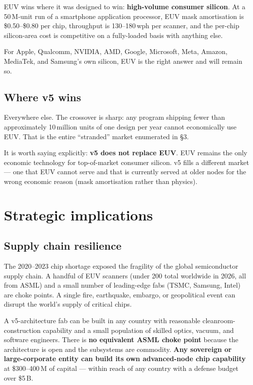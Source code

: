 \documentclass[11pt,letterpaper]{article}
\begin{document}
EUV wins where it was designed to win: \textbf{high-volume consumer silicon}. At a 50\,M-unit run of a smartphone application processor, EUV mask amortisation is \$0.50--\$0.80 per chip, throughput is 130--180\,wph per scanner, and the per-chip silicon-area cost is competitive on a fully-loaded basis with anything else.

For Apple, Qualcomm, NVIDIA, AMD, Google, Microsoft, Meta, Amazon, MediaTek, and Samsung's own silicon, EUV is the right answer and will remain so.

\subsection{Where v5 wins}

Everywhere else. The crossover is sharp: any program shipping fewer than approximately 10\,million units of one design per year cannot economically use EUV. That is the entire ``stranded'' market enumerated in \S 3.

It is worth saying explicitly: \textbf{v5 does not replace EUV}. EUV remains the only economic technology for top-of-market consumer silicon. v5 fills a different market --- one that EUV cannot serve and that is currently served at older nodes for the wrong economic reason (mask amortisation rather than physics).

\section{Strategic implications}

\subsection{Supply chain resilience}

The 2020--2023 chip shortage exposed the fragility of the global semiconductor supply chain. A handful of EUV scanners (under 200 total worldwide in 2026, all from ASML) and a small number of leading-edge fabs (TSMC, Samsung, Intel) are choke points. A single fire, earthquake, embargo, or geopolitical event can disrupt the world's supply of critical chips.

A v5-architecture fab can be built in any country with reasonable cleanroom-construction capability and a small population of skilled optics, vacuum, and software engineers. There is \textbf{no equivalent ASML choke point} because the architecture is open and the subsystems are commodity. \textbf{Any sovereign or large-corporate entity can build its own advanced-node chip capability} at \$300--400\,M of capital --- within reach of any country with a defense budget over \$5\,B.
\end{document}
